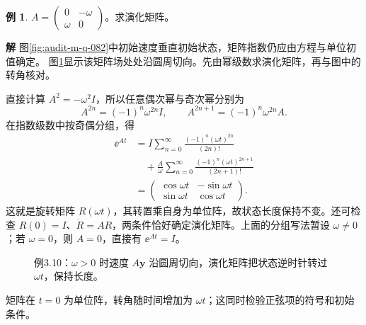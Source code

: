 \documentclass[11pt,openany,fontset=fandol]{ctexbook}
\theoremstyle{plain}\newtheorem{theorem}{定理}[chapter]\newtheorem{proposition}[theorem]{命题}
\theoremstyle{definition}\newtheorem{definition}{定义}[chapter]\newtheorem{example}{例}[chapter]
\theoremstyle{remark}\newtheorem*{remark}{说明}
\newcommand{\SolutionStart}{\par\nobreak\medskip\nobreak\noindent\textbf{解}\quad\ignorespaces}
\newenvironment{solution}{\SolutionStart}{\par\medskip}
\newcommand{\vct}[1]{\bm{#1}}\newcommand{\Rea}{\operatorname{Re}}\newcommand{\Ima}{\operatorname{Im}}
\begin{document}
\begin{example}
$A=\begin{pmatrix}0&-\omega\\\omega&0\end{pmatrix}$。求演化矩阵。
\end{example}

\begin{solution}
图\ref{fig:audit-m-q-082}中初始速度垂直初始状态，矩阵指数仍应由方程与单位初值确定。
图\ref{fig:eg-3-10}显示该矩阵场处处沿圆周切向。先由幂级数求演化矩阵，再与图中的转角核对。

直接计算 $A^2=-\omega^2I$，所以任意偶次幂与奇次幂分别为
\[
A^{2n}=(-1)^n\omega^{2n}I,\qquad
A^{2n+1}=(-1)^n\omega^{2n}A.
\]
在指数级数中按奇偶分组，得
\begin{align*}
\ee^{At}&=I\sum_{n=0}^\infty\frac{(-1)^n(\omega t)^{2n}}{(2n)!}\\
&\quad+\frac A\omega\sum_{n=0}^\infty\frac{(-1)^n(\omega t)^{2n+1}}{(2n+1)!}\\
&=\begin{pmatrix}\cos\omega t&-\sin\omega t\\\sin\omega t&\cos\omega t\end{pmatrix}.
\end{align*}
这就是旋转矩阵 $R(\omega t)$，其转置乘自身为单位阵，故状态长度保持不变。还可检查 $R(0)=I$、$\dot R=AR$，两条件恰好确定演化矩阵。上面的分组写法暂设 $\omega\ne0$；若 $\omega=0$，则 $A=0$，直接有 $\ee^{At}=I$。

\begin{figure}[H]\centering
{}
\caption{例3.10：$\omega>0$ 时速度 $A\vct y$ 沿圆周切向，演化矩阵把状态逆时针转过 $\omega t$，保持长度。}\label{fig:eg-3-10}
\end{figure}

矩阵在 $t=0$ 为单位阵，转角随时间增加为 $\omega t$；这同时检验正弦项的符号和初始条件。
\end{solution}
\end{document}

